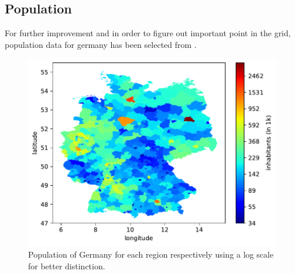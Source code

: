\subsection{Population}

For further improvement and in order to figure out important point in the grid, population data for germany has been  selected from .\\

\begin{figure}[h!]%
\centering
\includegraphics[width=\textwidth]{plots/demo/demo2018_logscale}%
\caption{Population of Germany for each region respectively using a log scale for better distinction.}%
\label{fig:demo2018_logscale}%
\end{figure}




